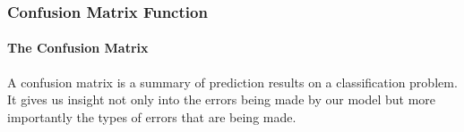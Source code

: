 \documentclass[11pt]{article}
\begin{document}
    \hypertarget{confusion-matrix-function}{%
\subsubsection{Confusion Matrix
Function}\label{confusion-matrix-function}}

\hypertarget{the-confusion-matrix}{%
\paragraph{The Confusion Matrix}\label{the-confusion-matrix}}

A confusion matrix is a summary of prediction results on a
classification problem. It gives us insight not only into the errors
being made by our model but more importantly the types of errors that
are being made.
\end{document}
